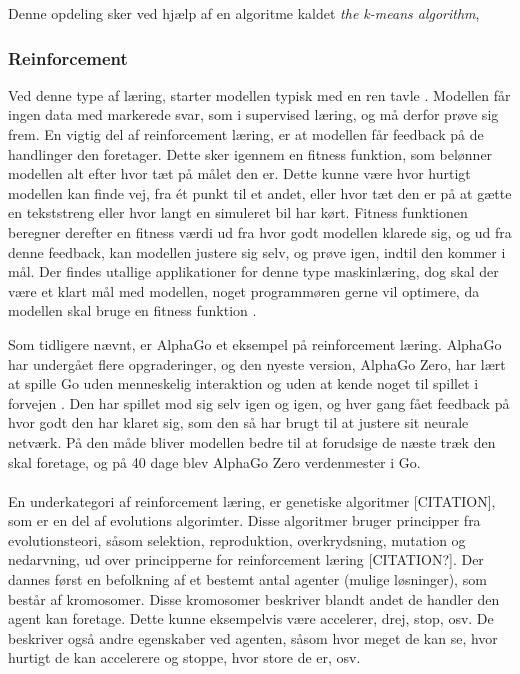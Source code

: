 Denne opdeling sker ved hjælp af en algoritme kaldet \textit{the k-means algorithm}, 


\subsubsection*{Reinforcement}
Ved denne type af læring, starter modellen typisk med en ren tavle \citep{deep-reinforcement-learning}. Modellen får ingen data med markerede svar, som i supervised læring, og må derfor prøve sig frem. En vigtig del af reinforcement læring, er at modellen får feedback på de handlinger den foretager. Dette sker igennem en fitness funktion, som belønner modellen alt efter hvor tæt på målet den er. Dette kunne være hvor hurtigt modellen kan finde vej, fra ét punkt til et andet, eller hvor tæt den er på at gætte en tekststreng eller hvor langt en simuleret bil har kørt. Fitness funktionen beregner derefter en fitness værdi ud fra hvor godt modellen klarede sig, og ud fra denne feedback, kan modellen justere sig selv, og prøve igen, indtil den kommer i mål. Der findes utallige applikationer for denne type maskinlæring, dog skal der være et klart mål med modellen, noget programmøren gerne vil optimere, da modellen skal bruge en fitness funktion \citep{deep-reinforcement-learning}. 
\par
Som tidligere nævnt, er AlphaGo et eksempel på reinforcement læring. AlphaGo har undergået flere opgraderinger, og den nyeste version, AlphaGo Zero, har lært at spille Go uden menneskelig interaktion og uden at kende noget til spillet i forvejen \citep{alphago}. Den har spillet mod sig selv igen og igen, og hver gang fået feedback på hvor godt den har klaret sig, som den så har brugt til at justere sit neurale netværk. På den måde bliver modellen bedre til at forudsige de næste træk den skal foretage, og på 40 dage blev AlphaGo Zero verdenmester i Go.
\\\\
En underkategori af reinforcement læring, er genetiske algoritmer [CITATION], som er en del af evolutions algorimter. Disse algoritmer bruger principper fra evolutionsteori, såsom selektion, reproduktion, overkrydsning, mutation og nedarvning, ud over principperne for reinforcement læring [CITATION?]. Der dannes først en befolkning af et bestemt antal agenter (mulige løsninger), som består af kromosomer. Disse kromosomer beskriver blandt andet de handler den agent kan foretage. Dette kunne eksempelvis være accelerer, drej, stop, osv.  De beskriver også andre egenskaber ved agenten, såsom hvor meget de kan se, hvor hurtigt de kan accelerere og stoppe, hvor store de er, osv. 
